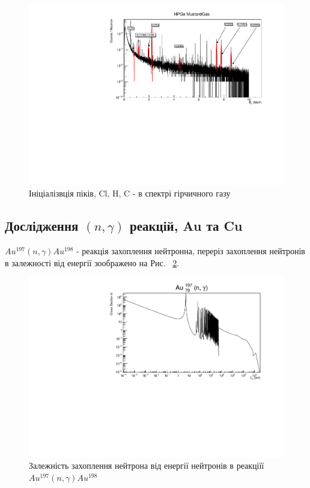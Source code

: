 \documentclass[a4paper, 14pt]{article}
\numberwithin{equation}{section}
\numberwithin{table}{section}
\begin{document}
	\begin{figure}[hbt!]
		\centering \includegraphics[width=1\textwidth]{res/mustard_gas.pdf}
		\caption{Ініціалізвція піків, Cl, H, C - в спектрі гірчичного газу} 
		\label{ris:mustard}	
	\end{figure} 
	
\subsection{Дослідження $(n, \gamma)$ реакцій, Au та Cu} 
$Au^{197}(n,\gamma)Au^{198}$ - реакція захоплення нейтронна, переріз захоплення нейтронів в залежності від енергії зоображено на Рис.~ \ref{ris:AuSigma}.
\begin{figure}[hbt!]
	\centering \includegraphics[width=1\textwidth]{sigma/Au197Sigma.pdf}
	\caption{Залежність захоплення нейтрона від енергії нейтронів в реакціїї  $Au^{197}(n,\gamma)Au^{198}$} 
	\label{ris:AuSigma}	
\end{figure} 
\end{document}
